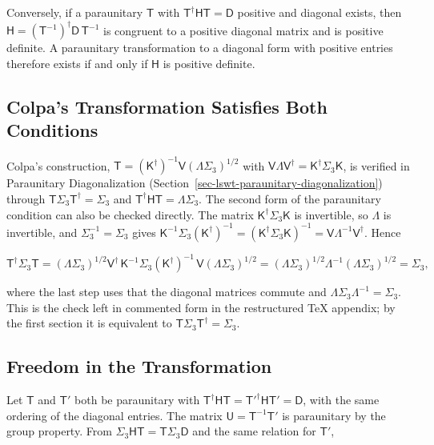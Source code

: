 Conversely, if a paraunitary \(\mathsf T\) with \(\mathsf T^\dagger\mathsf H\mathsf T=\mathsf D\) positive and diagonal exists, then \(\mathsf H=(\mathsf T^{-1})^\dagger\mathsf D\,\mathsf T^{-1}\) is congruent to a positive diagonal matrix and is positive definite. A paraunitary transformation to a diagonal form with positive entries therefore exists if and only if \(\mathsf H\) is positive definite.

\subsection{Colpa's Transformation Satisfies Both Conditions}

Colpa's construction, \(\mathsf T=(\mathsf K^\dagger)^{-1}\mathsf V(\Lambda\Sigma_3)^{1/2}\) with \(\mathsf V\Lambda\mathsf V^\dagger=\mathsf K^\dagger\Sigma_3\mathsf K\), is verified in Paraunitary Diagonalization (Section~\ref{sec-lswt-paraunitary-diagonalization}) through \(\mathsf T\Sigma_3\mathsf T^\dagger=\Sigma_3\) and \(\mathsf T^\dagger\mathsf H\mathsf T=\Lambda\Sigma_3\). The second form of the paraunitary condition can also be checked directly. The matrix \(\mathsf K^\dagger\Sigma_3\mathsf K\) is invertible, so \(\Lambda\) is invertible, and \(\Sigma_3^{-1}=\Sigma_3\) gives \(\mathsf K^{-1}\Sigma_3(\mathsf K^\dagger)^{-1}=(\mathsf K^\dagger\Sigma_3\mathsf K)^{-1}=\mathsf V\Lambda^{-1}\mathsf V^\dagger\). Hence

\[
\mathsf T^\dagger\Sigma_3\mathsf T
=(\Lambda\Sigma_3)^{1/2}\mathsf V^\dagger\,\mathsf K^{-1}\Sigma_3(\mathsf K^\dagger)^{-1}\,\mathsf V(\Lambda\Sigma_3)^{1/2}
=(\Lambda\Sigma_3)^{1/2}\Lambda^{-1}(\Lambda\Sigma_3)^{1/2}
=\Sigma_3,
\]

where the last step uses that the diagonal matrices commute and \(\Lambda\Sigma_3\Lambda^{-1}=\Sigma_3\). This is the check left in commented form in the restructured TeX appendix; by the first section it is equivalent to \(\mathsf T\Sigma_3\mathsf T^\dagger=\Sigma_3\).

\subsection{Freedom in the Transformation}

Let \(\mathsf T\) and \(\mathsf T'\) both be paraunitary with \(\mathsf T^\dagger\mathsf H\mathsf T=\mathsf T'^\dagger\mathsf H\mathsf T'=\mathsf D\), with the same ordering of the diagonal entries. The matrix \(\mathsf U=\mathsf T^{-1}\mathsf T'\) is paraunitary by the group property. From \(\Sigma_3\mathsf H\mathsf T=\mathsf T\Sigma_3\mathsf D\) and the same relation for \(\mathsf T'\),

